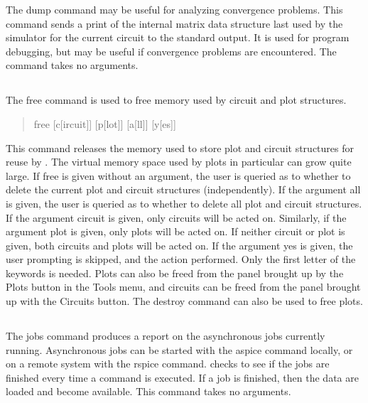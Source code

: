 
The {\cb dump} command may be useful for analyzing convergence problems.
This command sends a print of the internal matrix data structure last
used by the simulator for the current circuit to the standard output. 
It is used for program debugging, but may be useful if convergence
problems are encountered.  The command takes no arguments.

\subsection{}


The {\cb free} command is used to free memory used by circuit and plot
structures.
\begin{quote}\vt
free [c[ircuit]] [p[lot]] [a[ll]] [y[es]]
\end{quote}
This command releases the memory used to store plot and circuit
structures for reuse by {\WRspice}.  The virtual memory space used by
plots in particular can grow quite large.  If {\cb free} is given
without an argument, the user is queried as to whether to delete the
current plot and circuit structures (independently).  If the argument
{\vt all} is given, the user is queried as to whether to delete all
plot and circuit structures.  If the argument {\vt circuit} is given,
only circuits will be acted on.  Similarly, if the argument {\vt plot}
is given, only plots will be acted on.  If neither {\vt circuit} or
{\vt plot} is given, both circuits and plots will be acted on.  If the
argument {\vt yes} is given, the user prompting is skipped, and the
action performed.  Only the first letter of the keywords is needed. 
Plots can also be freed from the panel brought up by the {\cb Plots}
button in the {\cb Tools} menu, and circuits can be freed from the
panel brought up with the {\cb Circuits} button.  The {\cb destroy}
command can also be used to free plots.

\subsection{}


The {\cb jobs} command produces a report on the asynchronous
{\WRspice} jobs currently running.  Asynchronous jobs can be started
with the {\cb aspice} command locally, or on a remote system with the
{\cb rspice} command.  {\WRspice} checks to see if the jobs are
finished every time a command is executed.  If a job is finished, then
the data are loaded and become available.  This command takes no
arguments.

